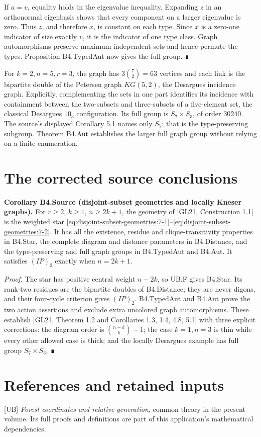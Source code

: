 If \(a=v\), equality holds in the eigenvalue inequality. Expanding \(z\) in an orthonormal eigenbasis shows that every component on a larger eigenvalue is zero. Thus \(z\), and therefore \(x\), is constant on each type. Since \(x\) is a zero-one indicator of size exactly \(v\), it is the indicator of one type class. Graph automorphisms preserve maximum independent sets and hence permute the types. Proposition B4.TypedAut now gives the full group. ∎

For \(k=2,n=5,r=3\), the graph has \(3\binom72=63\) vertices and each link is the bipartite double of the Petersen graph \(KG(5,2)\), the Desargues incidence graph. Explicitly, complementing the sets in one part identifies its incidence with containment between the two-subsets and three-subsets of a five-element set, the classical Desargues \(10_3\) configuration. Its full group is \(S_7\times S_3\), of order \(30240\). The source's displayed Corollary 5.1 names only \(S_7\); that is the type-preserving subgroup. Theorem B4.Aut establishes the larger full graph group without relying on a finite enumeration.
\section{The corrected source conclusions}
\textbf{Corollary B4.Source (disjoint-subset geometries and locally Kneser graphs).} For \(r\geq2\), \(k\geq1\), \(n\geq2k+1\), the geometry of {[}GL21, Construction 1.1{]} is the weighted star \eqref{eq:disjoint-subset-geometries:7-1}--\eqref{eq:disjoint-subset-geometries:7-2}. It has all the existence, residue and clique-transitivity properties in B4.Star, the complete diagram and distance parameters in B4.Distance, and the type-preserving and full graph groups in B4.TypedAut and B4.Aut. It satisfies \((IP)_2\) exactly when \(n=2k+1\).

\emph{Proof.} The star has positive central weight \(n-2k\), so UB.F gives B4.Star. Its rank-two residues are the bipartite doubles of B4.Distance; they are never digons, and their four-cycle criterion gives \((IP)_2\). B4.TypedAut and B4.Aut prove the two action assertions and exclude extra uncolored graph automorphisms. These establish {[}GL21, Theorem 1.2 and Corollaries 1.3, 1.4, 4.8, 5.1{]} with three explicit corrections: the diagram order is \(\binom{n-k}{k}-1\); the case \(k=1,n=3\) is thin while every other allowed case is thick; and the locally Desargues example has full group \(S_7\times S_3\). ∎

\section*{References and retained inputs}
{[}UB{]} \emph{Forest coordinates and relative generation}, common theory in the present volume. Its full proofs and definitions are part of this application's mathematical dependencies.

